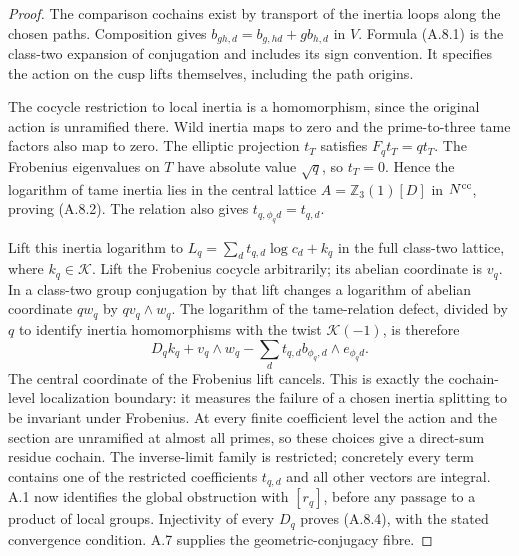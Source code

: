 \begin{proof}
The comparison cochains exist by transport of the inertia loops
along the chosen paths. Composition gives
$b_{gh,d}=b_{g,hd}+g b_{h,d}$ in $V$. Formula (A.8.1) is the
class-two expansion of conjugation and includes its sign convention.
It specifies the action on the cusp lifts themselves, including
the path origins.

The cocycle restriction to local inertia is a homomorphism,
since the original action is unramified there. Wild inertia maps
to zero and the prime-to-three tame factors also map to zero.
The elliptic projection $t_T$ satisfies $F_qt_T=qt_T$.
The Frobenius eigenvalues on $T$ have absolute value $\sqrt q$,
so $t_T=0$. Hence the logarithm of tame inertia lies in the central
lattice $A=\mathbb Z_3(1)[D]$ in $N^{\rm cc}$, proving (A.8.2).
The relation also gives $t_{q,\phi_qd}=t_{q,d}$.

Lift this inertia logarithm to
$L_q=\sum_dt_{q,d}\log c_d+k_q$ in the full class-two lattice,
where $k_q\in\mathcal K$. Lift the Frobenius cocycle arbitrarily;
its abelian coordinate is $v_q$. In a class-two group conjugation
by that lift changes a logarithm of abelian coordinate $qw_q$
by $qv_q\wedge w_q$. The logarithm of the tame-relation defect,
divided by $q$ to identify inertia homomorphisms with the twist
$\mathcal K(-1)$, is therefore
\[
 D_qk_q+v_q\wedge w_q-
       \sum_dt_{q,d}b_{\phi_q,d}\wedge e_{\phi_qd}.
\]
The central coordinate of the Frobenius lift cancels. This is
exactly the cochain-level localization boundary: it measures the
failure of a chosen inertia splitting to be invariant under
Frobenius. At every finite coefficient level the action and the
section are unramified at almost all primes, so these choices give
a direct-sum residue cochain. The inverse-limit family is
restricted; concretely every term contains one of the restricted
coefficients $t_{q,d}$ and all other vectors are integral. A.1 now
identifies the global obstruction with $[r_q]$, before any passage
to a product of local groups. Injectivity of every $D_q$ proves
(A.8.4), with the stated convergence condition. A.7 supplies the
geometric-conjugacy fibre.
\end{proof}

